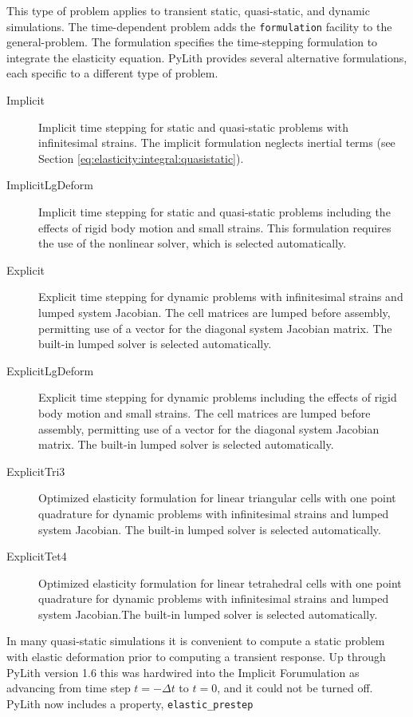 This type of problem applies to transient static, quasi-static, and
dynamic simulations. The time-dependent problem adds the \texttt{formulation}
facility to the general-problem. The formulation specifies the time-stepping
formulation to integrate the elasticity equation. PyLith provides
several alternative formulations, each specific to a different type
of problem.
\begin{description}
\item [{Implicit}] Implicit time stepping for static and quasi-static problems
with infinitesimal strains. The implicit formulation neglects inertial
terms (see Section \vref{eq:elasticity:integral:quasistatic}). 
\item [{ImplicitLgDeform}] Implicit time stepping for static and quasi-static
problems including the effects of rigid body motion and small strains.
This formulation requires the use of the nonlinear solver, which is
selected automatically.
\item [{Explicit}] Explicit time stepping for dynamic problems with infinitesimal
strains and lumped system Jacobian. The cell matrices are lumped before
assembly, permitting use of a vector for the diagonal system Jacobian
matrix. The built-in lumped solver is selected automatically.
\item [{ExplicitLgDeform}] Explicit time stepping for dynamic problems
including the effects of rigid body motion and small strains. The
cell matrices are lumped before assembly, permitting use of a vector
for the diagonal system Jacobian matrix. The built-in lumped solver
is selected automatically.
\item [{ExplicitTri3}] Optimized elasticity formulation for linear triangular
cells with one point quadrature for dynamic problems with infinitesimal
strains and lumped system Jacobian. The built-in lumped solver is
selected automatically.
\item [{ExplicitTet4}] Optimized elasticity formulation for linear tetrahedral
cells with one point quadrature for dynamic problems with infinitesimal
strains and lumped system Jacobian.The built-in lumped solver is selected
automatically.
\end{description}
In many quasi-static simulations it is convenient to compute a static
problem with elastic deformation prior to computing a transient response.
Up through PyLith version 1.6 this was hardwired into the Implicit
Forumulation as advancing from time step $t=-\Delta t$ to $t=0$,
and it could not be turned off. PyLith now includes a property, \texttt{elastic\_prestep}
